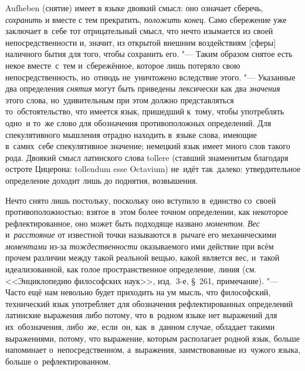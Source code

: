 Aufheben (снятие) имеет в языке двоякий смысл: оно означает сберечь,
{\em сохранить} и вместе с тем прекратить, {\em положить конец}. Само
сбережение уже заключает в~себе тот отрицательный смысл, что нечто изымается из
своей непосредственности и, значит, из открытой внешним воздействиям [сферы]
наличного бытия для того, чтобы сохранить его. "--- Таким образом снятое есть
некое вместе~с~тем и~сбережённое, которое лишь потеряло свою
непосредственность, но~отнюдь не~уничтожено вследствие этого. "--- Указанные
два определения {\em снятия} могут быть приведены лексически как два {\em
значения} этого слова, но~удивительным при этом должно представляться
то~обстоятельство, что имеется язык, пришедший к~тому, чтобы употреблять одно~и
то~же слово для обозначения противоположных определений. Для спекулятивного
мышления отрадно находить в~языке слова, имеющие в~самих~себе спекулятивное
значение; немецкий язык имеет много слов такого рода. Двоякий смысл латинского
слова tollere (ставший знаменитым благодаря остроте Цицерона: tollendum esse
Octavium) не~идёт
так~далеко: утвердительное определение доходит лишь до поднятия, возвышения.

Нечто снято лишь постольку, поскольку оно вступило в~единство со~своей
противоположностью; взятое в~этом более точном определении, как некоторое
рефлектированное, оно может быть подходяще названо {\em моментом}. {\em Вес}
и~{\em расстояние} от известной точки называются в~рычаге его механическими
{\em моментами} из-за {\em тождественности} оказываемого ими действие при всём
прочем различии между такой реальной вещью, какой является вес, и~такой
идеализованной, как голое пространственное определение, линия (см.
<<Энциклопедию философских наук>>, изд.~3-е, \S~261, примечание). "--- Часто
ещё нам невольно будет приходить на ум мысль, что философский, технический язык
употребляет для обозначения рефлектированных определений латинские
выражения либо потому, что в~родном языке нет выражений
для их~обозначения, либо~же, если~он, как~в~данном случае, обладает такими
выражениями, потому, что выражение, которым располагает родной язык, больше
напоминает о~непосредственном, а~выражения, заимствованные из~чужого языка,
больше о~рефлектированном.

